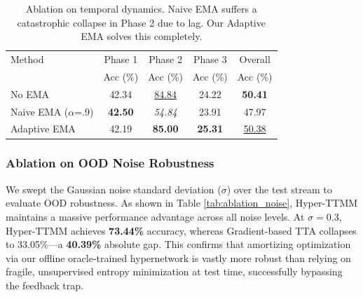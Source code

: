 \documentclass{article}
\theoremstyle{plain}
\theoremstyle{definition}
\theoremstyle{remark}
\begin{document}
\begin{table}[h]
\caption{Ablation on temporal dynamics. Naive EMA suffers a catastrophic collapse in Phase 2 due to lag. Our Adaptive EMA solves this completely.}
\label{tab:ablation_ema}
\vskip 0.15in
\begin{center}
\begin{small}
\begin{sc}
\setlength{\tabcolsep}{2.5pt}
\begin{tabular}{lcccc}
\toprule
Method & Phase 1 & Phase 2 & Phase 3 & Overall \\
& Acc (\%) & Acc (\%) & Acc (\%) & Acc (\%) \\
\midrule
No EMA & 42.34 & \underline{84.84} & 24.22 & \textbf{50.41} \\
Naive EMA ($\alpha$=.9) & \textbf{42.50} & \textit{54.84} & 23.91 & 47.97 \\
Adaptive EMA & 42.19 & \textbf{85.00} & \textbf{25.31} & \underline{50.38} \\
\bottomrule
\end{tabular}
\end{sc}
\end{small}
\end{center}
\vskip -0.1in
\end{table}


\subsubsection{Ablation on OOD Noise Robustness}
We swept the Gaussian noise standard deviation ($\sigma$) over the test stream to evaluate OOD robustness. As shown in Table \ref{tab:ablation_noise}, Hyper-TTMM maintains a massive performance advantage across all noise levels. At $\sigma=0.3$, Hyper-TTMM achieves \textbf{73.44\%} accuracy, whereas Gradient-based TTA collapses to 33.05\%---a \textbf{40.39\%} absolute gap. This confirms that amortizing optimization via our offline oracle-trained hypernetwork is vastly more robust than relying on fragile, unsupervised entropy minimization at test time, successfully bypassing the feedback trap.
\end{document}
